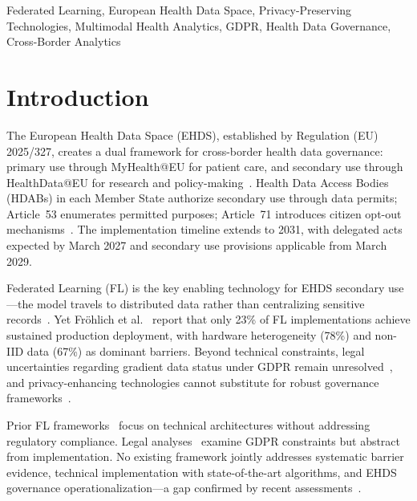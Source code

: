 \documentclass[conference]{IEEEtran}
\begin{document}
\begin{IEEEkeywords}
Federated Learning, European Health Data Space, Privacy-Preserving Technologies, Multimodal Health Analytics, GDPR, Health Data Governance, Cross-Border Analytics
\end{IEEEkeywords}

\section{Introduction}
\label{sec:introduction}

The European Health Data Space (EHDS), established by Regulation (EU) 2025/327, creates a dual framework for cross-border health data governance: primary use through MyHealth@EU for patient care, and secondary use through HealthData@EU for research and policy-making~\cite{eu2025ehds}. Health Data Access Bodies (HDABs) in each Member State authorize secondary use through data permits; Article~53 enumerates permitted purposes; Article~71 introduces citizen opt-out mechanisms~\cite{staunton2024ethical}. The implementation timeline extends to 2031, with delegated acts expected by March 2027 and secondary use provisions applicable from March 2029.

Federated Learning (FL) is the key enabling technology for EHDS secondary use---the model travels to distributed data rather than centralizing sensitive records~\cite{mcmahan2017communication, kairouz2021advances}. Yet Fr\"ohlich et al.~\cite{frohlich2025reality} report that only 23\% of FL implementations achieve sustained production deployment, with hardware heterogeneity (78\%) and non-IID data (67\%) as dominant barriers. Beyond technical constraints, legal uncertainties regarding gradient data status under GDPR remain unresolved~\cite{quinn2024gdpr}, and privacy-enhancing technologies cannot substitute for robust governance frameworks~\cite{vandrumpt2025pets}.

Prior FL frameworks~\cite{rieke2020future, beutel2023flower, nvflare2023} focus on technical architectures without addressing regulatory compliance. Legal analyses~\cite{quinn2024gdpr, staunton2024ethical} examine GDPR constraints but abstract from implementation. No existing framework jointly addresses systematic barrier evidence, technical implementation with state-of-the-art algorithms, and EHDS governance operationalization---a gap confirmed by recent assessments~\cite{chaverodiez2026fair, teo2024systematic}.
\end{document}
